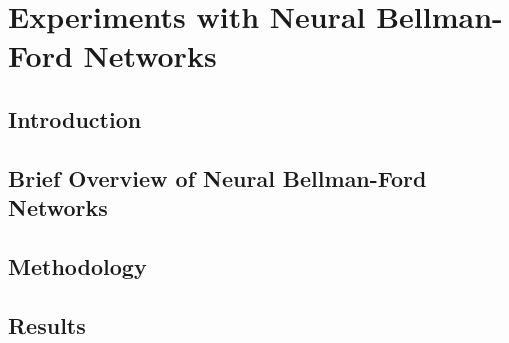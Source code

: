 \chapter{Experiments with Neural Bellman-Ford Networks}\label{ch:nbfnet}


\section{Introduction}\label{sec:nbfnet-introduction}


\section{Brief Overview of Neural Bellman-Ford Networks}\label{sec:nbfnet-description}



\section{Methodology}\label{sec:nbfnet-methodology}


\section{Results}\label{sec:nbfnet-results}
